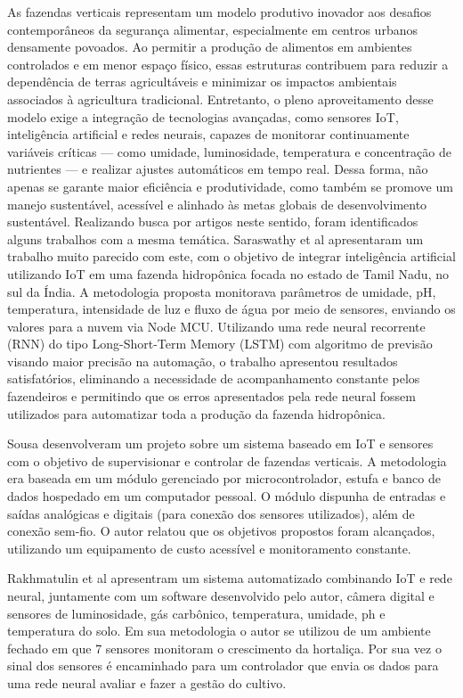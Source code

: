 As fazendas verticais representam um modelo produtivo inovador aos desafios contemporâneos da segurança alimentar, especialmente em centros urbanos densamente povoados. Ao permitir a produção de alimentos em ambientes controlados e em menor espaço físico, essas estruturas contribuem para reduzir a dependência de terras agricultáveis e minimizar os impactos ambientais associados à agricultura tradicional. Entretanto, o pleno aproveitamento desse modelo exige a integração de tecnologias avançadas, como sensores IoT, inteligência artificial e redes neurais, capazes de monitorar continuamente variáveis críticas — como umidade, luminosidade, temperatura e concentração de nutrientes — e realizar ajustes automáticos em tempo real. Dessa forma, não apenas se garante maior eficiência e produtividade, como também se promove um manejo sustentável, acessível e alinhado às metas globais de desenvolvimento sustentável. Realizando busca por artigos neste sentido, foram identificados alguns trabalhos com a mesma temática. Saraswathy et al \citeyear{saraswathy2020} apresentaram um trabalho muito parecido com este, com o objetivo de integrar inteligência artificial utilizando IoT em uma fazenda hidropônica focada no estado de Tamil Nadu, no sul da Índia. A metodologia proposta monitorava parâmetros de umidade, pH, temperatura, intensidade de luz e fluxo de água por meio de sensores, enviando os valores para a nuvem via Node MCU. Utilizando uma rede neural recorrente (RNN) do tipo Long-Short-Term Memory (LSTM) com algoritmo de previsão visando maior precisão na automação, o trabalho apresentou resultados satisfatórios, eliminando a necessidade de acompanhamento constante pelos fazendeiros e permitindo que os erros apresentados pela rede neural fossem utilizados para automatizar toda a produção da fazenda hidropônica.

Sousa \citeyear{sousa2023} desenvolveram um projeto sobre um sistema baseado em IoT e sensores com o objetivo de supervisionar e controlar de fazendas verticais. A metodologia era baseada em um módulo gerenciado por microcontrolador, estufa e banco de dados hospedado em um computador pessoal. O módulo dispunha de entradas e saídas analógicas e digitais (para conexão dos sensores utilizados), além de conexão sem-fio. O autor relatou que os objetivos propostos foram alcançados, utilizando um equipamento de custo acessível e monitoramento constante.

Rakhmatulin et al \citeyear{rakhmatulin2021} apresentram um sistema automatizado combinando IoT e rede neural, juntamente com um software desenvolvido pelo autor, câmera digital e sensores de luminosidade, gás carbônico, temperatura, umidade, ph e temperatura do solo. Em sua metodologia o autor se utilizou de um ambiente fechado em que 7 sensores monitoram o crescimento da hortaliça. Por sua vez o sinal dos sensores é encaminhado para um controlador que envia os dados para uma rede neural avaliar e fazer a gestão do cultivo.

